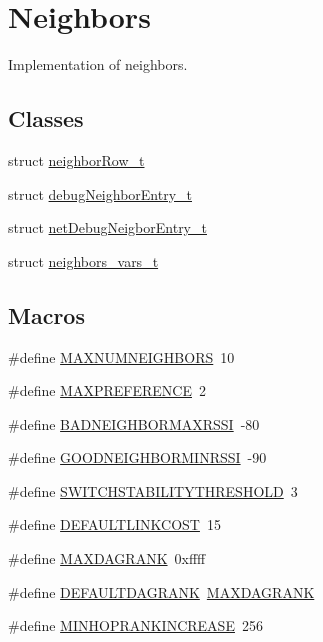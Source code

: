 \hypertarget{group___neighbors}{}\section{Neighbors}
\label{group___neighbors}


Implementation of neighbors.  


\subsection*{Classes}
\begin{DoxyCompactItemize}
\item 
struct \hyperlink{structneighbor_row__t}{neighbor\+Row\+\_\+t}
\item 
struct \hyperlink{structdebug_neighbor_entry__t}{debug\+Neighbor\+Entry\+\_\+t}
\item 
struct \hyperlink{structnet_debug_neigbor_entry__t}{net\+Debug\+Neigbor\+Entry\+\_\+t}
\item 
struct \hyperlink{structneighbors__vars__t}{neighbors\+\_\+vars\+\_\+t}
\end{DoxyCompactItemize}
\subsection*{Macros}
\begin{DoxyCompactItemize}
\item 
\#define \hyperlink{group___neighbors_gaf83606573bb704d34705b540c226a0d9}{M\+A\+X\+N\+U\+M\+N\+E\+I\+G\+H\+B\+O\+RS}~10
\item 
\#define \hyperlink{group___neighbors_ga6a269e3fd9f5dc2fe01c351944352799}{M\+A\+X\+P\+R\+E\+F\+E\+R\+E\+N\+CE}~2
\item 
\#define \hyperlink{group___neighbors_ga2c403faa9006b83e020166536b480025}{B\+A\+D\+N\+E\+I\+G\+H\+B\+O\+R\+M\+A\+X\+R\+S\+SI}~-\/80
\item 
\#define \hyperlink{group___neighbors_ga6e36748acedcb5b5ca037ad19227aeec}{G\+O\+O\+D\+N\+E\+I\+G\+H\+B\+O\+R\+M\+I\+N\+R\+S\+SI}~-\/90
\item 
\#define \hyperlink{group___neighbors_ga756051d437b8e4198fe0432b5d73a48b}{S\+W\+I\+T\+C\+H\+S\+T\+A\+B\+I\+L\+I\+T\+Y\+T\+H\+R\+E\+S\+H\+O\+LD}~3
\item 
\#define \hyperlink{group___neighbors_ga4d2874b0e44346069a08e6cf15d85d87}{D\+E\+F\+A\+U\+L\+T\+L\+I\+N\+K\+C\+O\+ST}~15
\item 
\#define \hyperlink{group___neighbors_gaec4751ff896721a5a0fd70b841d09724}{M\+A\+X\+D\+A\+G\+R\+A\+NK}~0xffff
\item 
\#define \hyperlink{group___neighbors_gacc9a3232f2dca59348d8b536005a2f89}{D\+E\+F\+A\+U\+L\+T\+D\+A\+G\+R\+A\+NK}~\hyperlink{group___neighbors_gaec4751ff896721a5a0fd70b841d09724}{M\+A\+X\+D\+A\+G\+R\+A\+NK}
\item 
\#define \hyperlink{group___neighbors_gaa81003e9317e9cd007be68d37a09eb40}{M\+I\+N\+H\+O\+P\+R\+A\+N\+K\+I\+N\+C\+R\+E\+A\+SE}~256
\end{DoxyCompactItemize}
